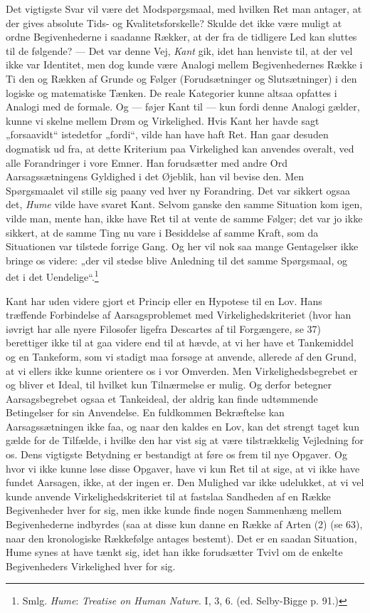\documentclass[12pt,a4paper]{book}
\newcommand{\opage}[1]{\marginnote{\footnotesize\textit{[#1]}}}
\newcommand{\apage}[1]{\marginnote{\footnotesize\textit{[#1]}}}
\begin{document}
Det vigtigste Svar vil være det Modspørgsmaal, med hvilken Ret man antager, at der
gives absolute Tids- og Kvalitetsforskelle? Skulde det ikke være muligt at ordne
Begivenhederne i saadanne Rækker, at der fra de tidligere Led kan sluttes til de
følgende? --- Det var denne Vej, \emph{Kant} gik, idet han henviste til, at der vel
ikke var Identitet, men dog kunde være Analogi mellem Begivenhedernes Række i Ti%
\opage{279}den
og Rækken af Grunde og Følger (Forudsætninger og Slutsætninger) i den logiske og
matematiske Tænken. De reale Kategorier kunne altsaa opfattes i Analogi med de
formale. Og --- føjer Kant til --- kun fordi denne Analogi gælder, kunne vi skelne
mellem Drøm og Virkelighed. Hvis Kant her havde sagt „forsaavidt“ istedetfor
„fordi“, vilde han have haft Ret. Han gaar desuden dogmatisk ud fra, at dette
Kriterium paa Virkelighed kan anvendes overalt, ved alle Forandringer i vore Emner.
Han forudsætter med andre Ord Aarsagssætningens Gyldighed i det Øjeblik, han vil
bevise den. Men Spørgsmaalet vil stille sig paany ved hver ny Forandring. Det var
sikkert ogsaa det, \emph{Hume} vilde have svaret Kant. Selvom ganske den samme
Situation kom igen, vilde man, mente han, ikke have Ret til at vente de samme
Følger; det var jo ikke sikkert, at de samme Ting nu vare i Besiddelse af samme
Kraft, som da Situationen var tilstede forrige Gang. Og her vil nok saa mange
Gentagelser ikke bringe os videre: „der vil stedse blive Anledning til det samme
Spørgsmaal, og det i det Uendelige“.\footnote{Smlg. \emph{Hume}: \emph{Treatise on
Human Nature}. I, 3, 6. (ed. Selby-Bigge p. 91.)}

Kant har uden videre gjort et Princip eller en Hypotese til en Lov. Hans træffende
Forbindelse af Aarsagsproblemet med Virkelighedskriteriet (hvor han iøvrigt har alle
nyere Filosofer ligefra Descartes af til Forgængere, se 37) berettiger ikke til at
gaa videre end til at hævde, at vi her have et Tankemiddel og en Tankeform, som vi
stadigt maa forsøge at anvende, allerede af den Grund, at vi ellers ikke kunne
orientere os i vor Omverden. Men Virkelighedsbegrebet er og bliver et Ideal, til
hvilket kun Tilnærmelse er mulig. Og derfor betegner Aarsagsbegrebet ogsaa et
Tankeideal, der aldrig kan finde udtømmende Betingelser for sin Anvendelse. En
fuldkommen Bekræftelse kan Aarsagssætningen ikke faa, og naar den kaldes en Lov, kan
det strengt taget kun gælde for de Tilfælde, i hvilke den har vist sig at være
tilstrækkelig Vejledning for os. Dens vigtigste Betydning er bestandigt at føre os
frem til nye Opgaver. Og hvor vi ikke kunne løse disse Opgaver, have vi kun Ret til
at sige, at \apage{280} vi ikke have fundet Aarsagen, ikke, at der ingen er. Den Mulighed var
ikke udelukket, at vi vel kunde anvende Virkelighedskriteriet til at fastslaa
Sandheden af en Række Begivenheder hver for sig, men ikke kunde finde nogen
Sammenhæng mellem Begivenhederne indbyrdes (saa at disse kun danne en Række af Arten
(2) (se 63), naar den kronologiske Rækkefølge antages bestemt). Det er en saadan
Situation, Hume synes at have tænkt sig, idet han ikke forudsætter Tvivl om de
enkelte Begivenheders Virkelighed hver for sig.
\end{document}

